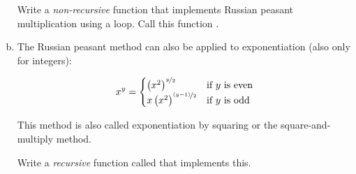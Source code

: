 \documentclass[11pt]{cselabheader}
\begin{document}
\begin{ex}[peasants.py]
\begin{enumerate}[(a)]
      Write a \emph{non-recursive} function that implements Russian
      peasant multiplication using a  loop. Call this
      function .

    \item The Russian peasant method can also be applied to exponentiation (also
      only for integers):

      \[ x^y = \begin{cases}
          \left( x^2 \right)^{\nicefrac{y}{2}} & \text{if $y$ is even} \\
          x \left( x^2 \right)^{\nicefrac{(y-1)}{2}} & \text{if $y$ is odd} \\
      \end{cases} \]

      This method is also called exponentiation by squaring or the
      square-and-multiply method.

      Write a \emph{recursive} function called  that
      implements this.

  \end{enumerate}

\end{ex}
\end{document}
